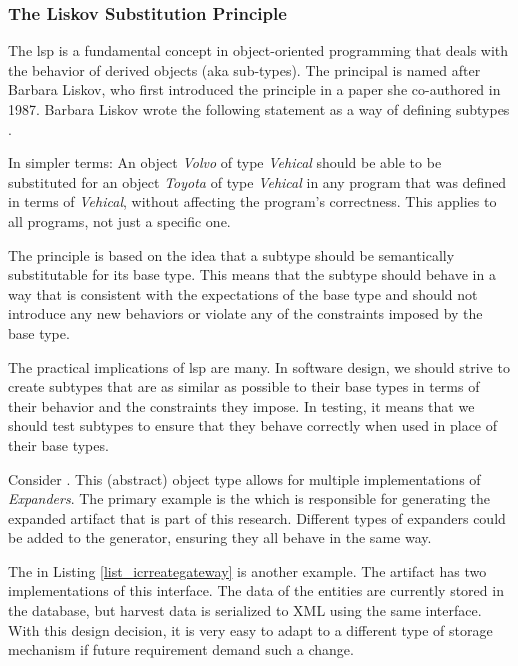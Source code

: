 \subsubsection{The Liskov Substitution Principle} \label{subsubsec_lsp}


The \gls{lsp} is a fundamental concept in object-oriented programming that deals with the
behavior of derived objects (aka sub-types). The principal is named after Barbara Liskov,
who first introduced the principle in a paper she co-authored in 1987. Barbara Liskov
wrote the following statement as a way of defining subtypes
\parencite[95]{robert_c_martin_clean_2018}.


In simpler terms: An object \textit{Volvo} of type \textit{Vehical} should be
able to be substituted for an object \textit{Toyota} of type \textit{Vehical} in any
program that was defined in terms of \textit{Vehical}, without affecting the program's
correctness. This applies to all programs, not just a specific one.

The principle is based on the idea that a subtype should be semantically substitutable for
its base type. This means that the subtype should behave in a way that is consistent with
the expectations of the base type and should not introduce any new behaviors or violate
any of the constraints imposed by the base type.

The practical implications of \gls{lsp} are many. In software design, we should strive to
create subtypes that are as similar as possible to their base types in terms of their
behavior and the constraints they impose. In testing, it means that we should test
subtypes to ensure that they behave correctly when used in place of their base types.

Consider . This (abstract) object type allows for
multiple implementations of \textit{Expanders}. The primary example is the
 which is responsible for generating the
expanded artifact that is part of this research. Different types of expanders could be
added to the generator, ensuring they all behave in the same way.

The  in Listing \ref{list_icrreategateway} is another
example. The artifact has two implementations of this interface. The data of the entities
are currently stored in the database, but harvest data is serialized to XML using the same
 interface. With this design decision, it is very easy to adapt
to a different type of storage mechanism if future requirement demand such a change.

